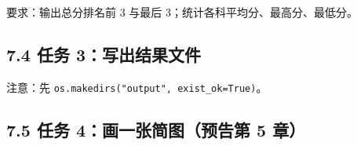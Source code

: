 要求：输出总分排名前 3 与最后 3；统计各科平均分、最高分、最低分。

\subsection{7.4 任务
3：写出结果文件}\label{ux4efbux52a1-3ux5199ux51faux7ed3ux679cux6587ux4ef6}

\begin{Shaded}
\begin{Highlighting}[]
 \NormalTok{(}\NormalTok{, }\OperatorTok{=}\NormalTok{) }
\NormalTok{)}
\SpecialCharTok{\{}\SpecialCharTok{\}}\SpecialStringTok{: }\SpecialCharTok{\{}\NormalTok{)}
\NormalTok{)}
    \NormalTok{ by\_avg[:}\NormalTok{]:}
\SpecialCharTok{\{}\NormalTok{r[}\NormalTok{]}\SpecialCharTok{\}}\SpecialCharTok{\{}\NormalTok{r[}\NormalTok{]}\NormalTok{)}
\NormalTok{(}\NormalTok{(}\OperatorTok{=}
\end{Highlighting}
\end{Shaded}

注意：先 \texttt{os.makedirs("output",\ exist\_ok=True)}。

\subsection{7.5 任务 4：画一张简图（预告第 5
章）}\label{ux4efbux52a1-4ux753bux4e00ux5f20ux7b80ux56feux9884ux544aux7b2c-5-ux7ae0}

